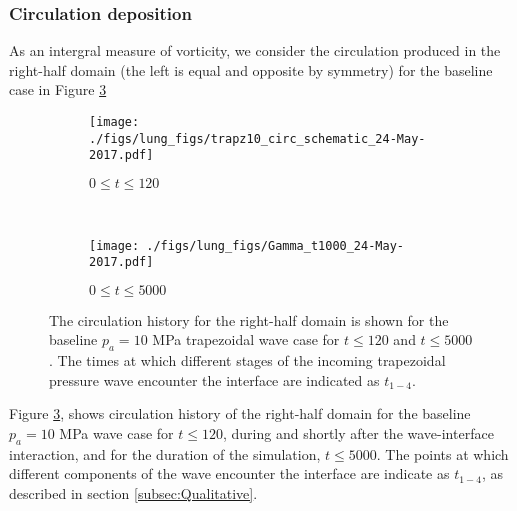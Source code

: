 \documentclass{jfm}%
\begin{document}
\subsubsection{Circulation deposition}
As an intergral measure of vorticity, we consider the circulation
produced in the right-half domain (the left is equal and opposite by
symmetry) for the baseline case in Figure
\ref{fig:trapz10_circ_schematic}%
\begin{figure}
  \centering
  \begin{subfigure}[b]{0.48\textwidth}
    \centering
    \texttt{[image: ./figs/lung\_figs/trapz10\_circ\_schematic\_24-May-2017.pdf]}
    \caption{\label{fig:trapz10_circ_schematic_t25} $0 \leq t \leq 120$ }
  \end{subfigure}
  ~
  \begin{subfigure}[b]{0.48\textwidth}
    \centering
    \texttt{[image: ./figs/lung\_figs/Gamma\_t1000\_24-May-2017.pdf]}
    \caption{\label{fig:trapz10_circ_schematic_t1000} $0 \leq t \leq 5000$}
  \end{subfigure}
  \caption[Circulation deposition by the $p_a = 10$ MPa trapezoidal
  wave] {The circulation history for the right-half domain is shown
    for the baseline $p_a = 10$ MPa trapezoidal wave case for
    $t \leq 120$ \protect{} and
    $t \leq 5000$
    \protect{}. The times at
    which different stages of the incoming trapezoidal pressure wave
    encounter the interface are indicated as $t_{1-4}$.}
  \label{fig:trapz10_circ_schematic}
\end{figure}
% 
Figure \ref{fig:trapz10_circ_schematic}, shows circulation history of
the right-half domain for the baseline $p_a = 10$ MPa wave case for $t \leq 120$, during
and shortly after the wave-interface interaction, and for the duration
of the simulation, $t \leq 5000$. The points at which different
components of the wave encounter the interface are indicate as
$t_{1-4}$, as described in section \ref{subsec:Qualitative}.
\end{document}
